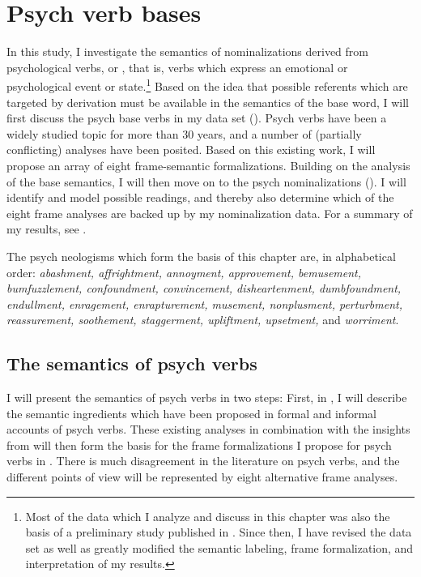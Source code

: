 \chapter[Psych verb bases]{Psych verb bases}
\label{ch:psy}

In this study, I investigate the semantics of nominalizations derived from psychological verbs, or , that is, verbs which express an emotional or psychological event or state.\footnote{Most of the data which I analyze and discuss in this chapter was also the basis of a preliminary study published in \citet{Kawaletz.2015}. Since then, I have revised the data set as well as greatly modified the semantic labeling, frame formalization, and interpretation of my results.} Based on the idea that possible referents which are targeted by derivation must be available in the semantics of the base word, I will first discuss the psych base verbs in my data set (). Psych verbs have been a widely studied topic for more than 30 years, and a number of (partially conflicting) analyses have been posited. Based on this existing work, I will propose an array of eight frame-semantic formalizations. Building on the analysis of the base semantics, I will then move on to the psych nominalizations (). I will identify and model possible readings, and thereby also determine which of the eight frame analyses are backed up by my nominalization data. For a summary of my results, see .

The psych neologisms which form the basis of this chapter are, in alphabetical order: \textit{abashment, affrightment, annoyment, approvement, bemusement, bumfuzzlement, confoundment, convincement, disheartenment, dumbfoundment, endullment, enragement, enrapturement, musement, nonplusment, perturbment, reassurement, soothement, staggerment, upliftment, upsetment,} and \textit{worriment}.  

\section{The semantics of psych verbs} 
\label{sec:psy-input}

I will present the semantics of psych verbs in two steps:
First, in , I will describe the semantic ingredients which have been proposed in formal and informal accounts of psych verbs. These existing analyses in combination with the insights from  will then form the basis for the frame formalizations I propose for psych verbs in . There is much disagreement in the literature on psych verbs, and the different points of view will be represented by eight alternative frame analyses.

